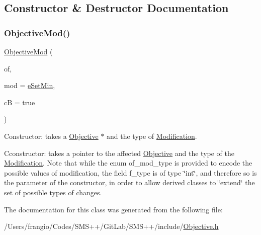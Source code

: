 \subsection{Constructor \& Destructor Documentation}
\mbox{\label{class_s_m_spp__di__unipi__it_1_1_objective_mod_a91e9e56853e9fe7cacbfb0c9348d3fcf}} 
\subsubsection{\texorpdfstring{Objective\+Mod()}{ObjectiveMod()}}
{\footnotesize\ttfamily \mbox{\hyperlink{class_s_m_spp__di__unipi__it_1_1_objective_mod}{Objective\+Mod}} (\begin{DoxyParamCaption}\item[{\mbox{\hyperlink{class_s_m_spp__di__unipi__it_1_1_objective}{Objective}} $\ast$}]{of,  }\item[{int}]{mod = {\ttfamily \mbox{\hyperlink{class_s_m_spp__di__unipi__it_1_1_objective_mod_addf23a536d33ccbb3c19b1d46e514b9dad8938f67f0bad1270a7cd6bf31af9fe5}{e\+Set\+Min}}},  }\item[{const bool}]{cB = {\ttfamily true} }\end{DoxyParamCaption})\hspace{0.3cm}{\ttfamily [inline]}}



Constructor\+: takes a \mbox{\hyperlink{class_s_m_spp__di__unipi__it_1_1_objective}{Objective}} $\ast$ and the type of \mbox{\hyperlink{class_s_m_spp__di__unipi__it_1_1_modification}{Modification}}. 

Cconstructor\+: takes a pointer to the affected \mbox{\hyperlink{class_s_m_spp__di__unipi__it_1_1_objective}{Objective}} and the type of the \mbox{\hyperlink{class_s_m_spp__di__unipi__it_1_1_modification}{Modification}}. Note that while the enum of\+\_\+mod\+\_\+type is provided to encode the possible values of modification, the field f\+\_\+type is of type \char`\"{}int\char`\"{}, and therefore so is the parameter of the constructor, in order to allow derived classes to \char`\"{}extend\char`\"{} the set of possible types of changes. 

The documentation for this class was generated from the following file\+:\begin{DoxyCompactItemize}
\item 
/\+Users/frangio/\+Codes/\+S\+M\+S++/\+Git\+Lab/\+S\+M\+S++/include/\mbox{\hyperlink{_objective_8h}{Objective.\+h}}\end{DoxyCompactItemize}
